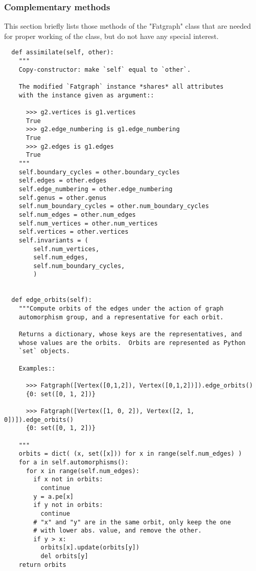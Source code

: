 \subsubsection{Complementary methods}
\label{sec:complementary}

This section briefly lists those methods of the "Fatgraph" class that
are needed for proper working of the class, but do not have any
special interest.

\begin{lstlisting}
  def assimilate(self, other):
    """
    Copy-constructor: make `self` equal to `other`.

    The modified `Fatgraph` instance *shares* all attributes
    with the instance given as argument::

      >>> g2.vertices is g1.vertices
      True
      >>> g2.edge_numbering is g1.edge_numbering
      True
      >>> g2.edges is g1.edges
      True
    """
    self.boundary_cycles = other.boundary_cycles
    self.edges = other.edges
    self.edge_numbering = other.edge_numbering
    self.genus = other.genus
    self.num_boundary_cycles = other.num_boundary_cycles
    self.num_edges = other.num_edges
    self.num_vertices = other.num_vertices
    self.vertices = other.vertices
    self.invariants = (
        self.num_vertices,
        self.num_edges,
        self.num_boundary_cycles,
        )


  def edge_orbits(self):
    """Compute orbits of the edges under the action of graph
    automorphism group, and a representative for each orbit.
    
    Returns a dictionary, whose keys are the representatives, and
    whose values are the orbits.  Orbits are represented as Python
    `set` objects.

    Examples::

      >>> Fatgraph([Vertex([0,1,2]), Vertex([0,1,2])]).edge_orbits()
      {0: set([0, 1, 2])}

      >>> Fatgraph([Vertex([1, 0, 2]), Vertex([2, 1, 0])]).edge_orbits()
      {0: set([0, 1, 2])}
      
    """
    orbits = dict( (x, set([x])) for x in range(self.num_edges) )
    for a in self.automorphisms():
      for x in range(self.num_edges):
        if x not in orbits:
          continue
        y = a.pe[x]
        if y not in orbits:
          continue
        # "x" and "y" are in the same orbit, only keep the one
        # with lower abs. value, and remove the other.
        if y > x:
          orbits[x].update(orbits[y])
          del orbits[y]
    return orbits


\end{lstlisting}
